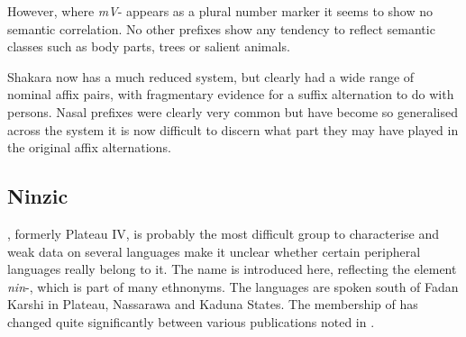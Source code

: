 \documentclass[output=paper]{langsci/langscibook}
\begin{document}
However, where \textit{mV}- appears as a plural number marker it seems to show no semantic correlation. No other  prefixes show any tendency to reflect semantic classes such as body parts, trees or salient animals.

Shakara now has a much reduced system, but  clearly had a wide range of nominal affix pairs, with fragmentary evidence for a suffix alternation to do with persons. Nasal prefixes were clearly very common but have become so generalised across the system it is now difficult to discern what part they may have played in the original affix alternations.

\subsection{Ninzic} %

, formerly Plateau IV, is probably the most difficult group to characterise and weak data on several languages make it unclear whether certain peripheral languages really belong to it. The name  is introduced here, reflecting the element \textit{nin}-, which is part of many ethnonyms. The  languages are spoken south of Fadan Karshi in Plateau, Nassarawa and Kaduna States. The membership of  has changed quite significantly between various publications noted in .
\end{document}
